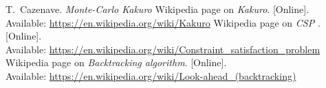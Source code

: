 \documentclass[french]{article}
\begin{document}
\newpage
\begin{thebibliography}{5}
    T.~Cazenave. {\em Monte-Carlo Kakuro}
   Wikipedia page on {\em Kakuro}. [Online]. \\ Available:  \url{ https://en.wikipedia.org/wiki/Kakuro}
   Wikipedia page on {\em CSP }. [Online]. \\ Available:  \url{https://en.wikipedia.org/wiki/Constraint_satisfaction_problem}
   Wikipedia page on {\em Backtracking algorithm}. [Online]. \\ Available:  \url{https://en.wikipedia.org/wiki/Look-ahead_(backtracking)}
\end{thebibliography}
\end{document}
